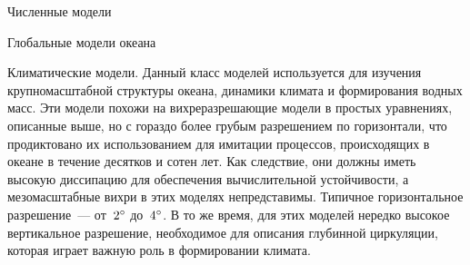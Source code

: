 \begin{chapter}{Численные модели}
\begin{section}{Глобальные модели океана}
\begin{paragraph}{Климатические модели.}
Данный класс моделей используется для изучения крупномасштабной структуры 
океана, динамики климата и формирования водных масс. Эти модели похожи на
вихреразрешающие модели в простых уравнениях, описанные выше, но
с гораздо более грубым разрешением по горизонтали, что продиктовано их
использованием для имитации процессов, происходящих в океане в течение 
десятков и сотен лет. Как следствие, они должны иметь высокую диссипацию
для обеспечения вычислительной устойчивости, а мезомасштабные вихри%
 в этих моделях непредставимы.
Типичное горизонтальное разрешение~--- от~${2}^\circ$ до~${4}^\circ$. 
В то же время, для этих моделей нередко высокое вертикальное разрешение,
необходимое для описания глубинной циркуляции, которая играет важную роль
в формировании климата.
% 
\end{paragraph}
\end{section}


\end{chapter}

